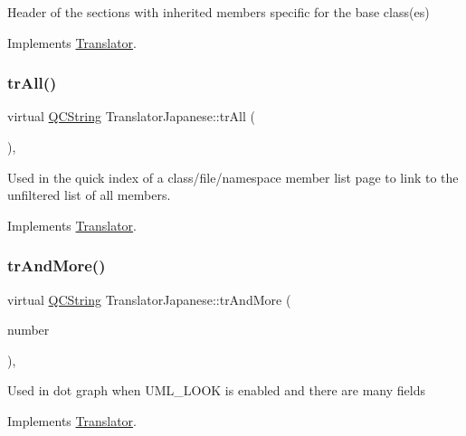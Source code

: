 Header of the sections with inherited members specific for the base class(es) 

Implements \mbox{\hyperlink{class_translator}{Translator}}.

\mbox{\label{class_translator_japanese_a914c07ec81642d7abb5b81bd65d730f0}} 
\subsubsection{\texorpdfstring{trAll()}{trAll()}}
{\footnotesize\ttfamily virtual \mbox{\hyperlink{class_q_c_string}{Q\+C\+String}} Translator\+Japanese\+::tr\+All (\begin{DoxyParamCaption}{ }\end{DoxyParamCaption})\hspace{0.3cm}{\ttfamily [inline]}, {\ttfamily [virtual]}}

Used in the quick index of a class/file/namespace member list page to link to the unfiltered list of all members. 

Implements \mbox{\hyperlink{class_translator}{Translator}}.

\mbox{\label{class_translator_japanese_a54f7d9f13f719d351d583befbcfad9c2}} 
\subsubsection{\texorpdfstring{trAndMore()}{trAndMore()}}
{\footnotesize\ttfamily virtual \mbox{\hyperlink{class_q_c_string}{Q\+C\+String}} Translator\+Japanese\+::tr\+And\+More (\begin{DoxyParamCaption}\item[{const \mbox{\hyperlink{class_q_c_string}{Q\+C\+String}} \&}]{number }\end{DoxyParamCaption})\hspace{0.3cm}{\ttfamily [inline]}, {\ttfamily [virtual]}}

Used in dot graph when U\+M\+L\+\_\+\+L\+O\+OK is enabled and there are many fields 

Implements \mbox{\hyperlink{class_translator}{Translator}}.

\mbox{\label{class_translator_japanese_a1d20c21ed02a1ab2f4fb7b6db59a7e58}} 
